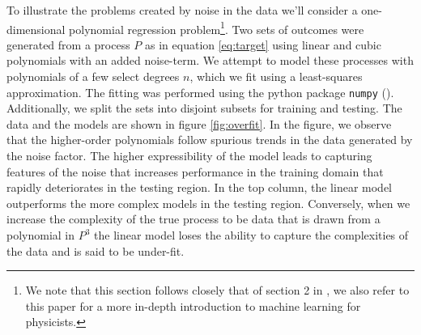 To illustrate the problems created by noise in the data we'll consider a one-dimensional polynomial regression problem\footnote{We note that this section follows closely that of section 2 in \citet{Mehta2019}, we also refer to this paper for a more in-depth introduction to machine learning for physicists.}. Two sets of outcomes were generated from a process $P$ as in equation \ref{eq:target} using linear and cubic polynomials with an added noise-term. We attempt to model these processes with polynomials of a few select degrees $n$, which we fit using a least-squares approximation. The fitting was performed using the python package \lstinline{numpy} (\cite{numpy}). Additionally, we split the sets into disjoint subsets for training and testing. The data and the models are shown in figure \ref{fig:overfit}. In the figure, we observe that the higher-order polynomials follow spurious trends in the data generated by the noise factor. The higher expressibility of the model leads to capturing features of the noise that increases performance in the training domain that rapidly deteriorates in the testing region. In the top column, the linear model outperforms the more complex models in the testing region. Conversely, when we increase the complexity of the true process to be data that is drawn from a polynomial in $P^3$ the linear model loses the ability to capture the complexities of the data and is said to be under-fit.  

